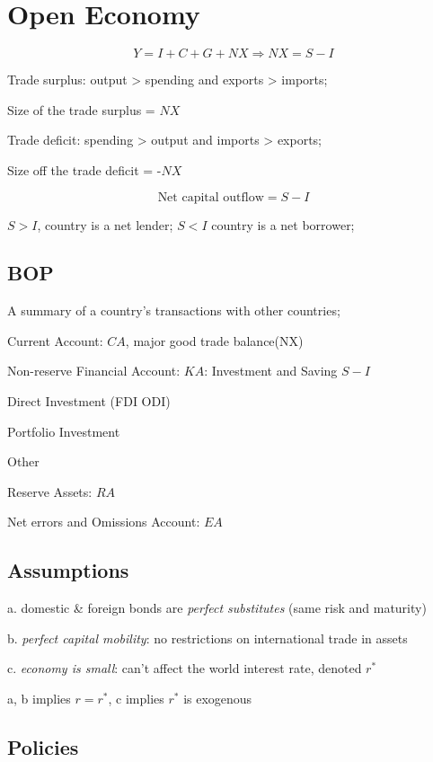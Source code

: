 \documentclass[10pt, a4paper]{article}
\begin{document}
\section{Open Economy}
    $$Y = I + C + G + NX \Rightarrow NX = S -I $$

    Trade surplus: output > spending and exports > imports; 
    
    Size of the trade surplus = $NX$

    Trade deficit: spending > output and imports > exports; 
    
    Size off the trade deficit = -$NX$

    $$\text{Net capital outflow} = S - I$$

    $S > I$, country is a net lender; $S < I$ country is a net borrower;

    \subsection{BOP}
    A summary of a country's transactions with other countries;
            
    Current Account: $CA$, major good trade balance(NX)

    Non-reserve Financial Account: $KA$: Investment and Saving $S - I$
        
        \quad Direct Investment (FDI ODI)

        \quad Portfolio Investment
        
        \quad Other 

    Reserve Assets: $RA$

    Net errors and Omissions Account: $EA$ 

    \subsection{Assumptions}
        a. domestic \& foreign bonds are \emph{perfect substitutes} (same risk and maturity)

        b. \emph{perfect capital mobility}: no restrictions on international trade in assets 

        c. \emph{economy is small}: can't affect the world interest rate, denoted $r^*$

        a, b implies $r = r^*$, c implies $r^*$ is exogenous

    \subsection{Policies}
\end{document}
